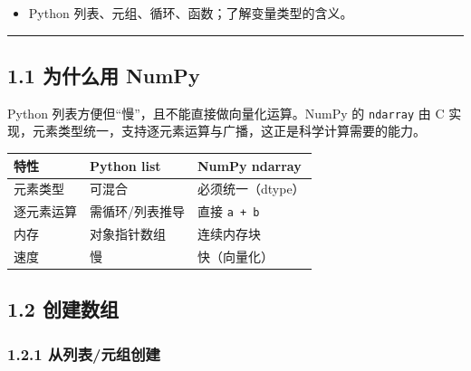 \begin{itemize}
\tightlist
\item
  Python 列表、元组、循环、函数；了解变量类型的含义。
\end{itemize}

\begin{center}\rule{0.5\linewidth}{0.5pt}\end{center}

\subsection{1.1 为什么用 NumPy}\label{ux4e3aux4ec0ux4e48ux7528-numpy}

Python 列表方便但``慢''，且不能直接做向量化运算。NumPy 的
\texttt{ndarray} 由 C
实现，元素类型统一，支持逐元素运算与广播，这正是科学计算需要的能力。

{\def\LTcaptype{none} %
\begin{longtable}[]{@{}lll@{}}
\toprule\noalign{}
特性 & Python list & NumPy ndarray \\
\midrule\noalign{}
\endhead
\bottomrule\noalign{}
\endlastfoot
元素类型 & 可混合 & 必须统一（dtype） \\
逐元素运算 & 需循环/列表推导 & 直接 \texttt{a\ +\ b} \\
内存 & 对象指针数组 & 连续内存块 \\
速度 & 慢 & 快（向量化） \\
\end{longtable}
}

\subsection{1.2 创建数组}\label{ux521bux5efaux6570ux7ec4}

\subsubsection{1.2.1
从列表/元组创建}\label{ux4eceux5217ux8868ux5143ux7ec4ux521bux5efa}

\begin{Shaded}
\begin{Highlighting}[]
\OperatorTok{=}\OperatorTok{=}\NormalTok{)}

\OperatorTok{=}\NormalTok{ np.array([}\NormalTok{, }\NormalTok{, }\NormalTok{, }\NormalTok{, }\NormalTok{])        }
\OperatorTok{=}\NormalTok{ np.array([[}\NormalTok{, }\NormalTok{, }\NormalTok{], [}\NormalTok{, }\NormalTok{, }\NormalTok{]]) }
\NormalTok{(}
\end{Highlighting}
\end{Shaded}

